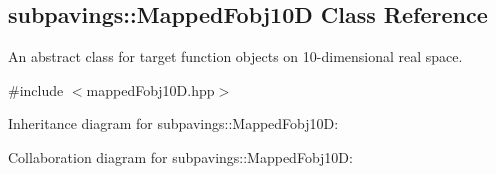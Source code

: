 \hypertarget{classsubpavings_1_1MappedFobj10D}{\subsection{subpavings\-:\-:\-Mapped\-Fobj10\-D \-Class \-Reference}
\label{classsubpavings_1_1MappedFobj10D}
}


\-An abstract class for target function objects on 10-\/dimensional real space.  




{\ttfamily \#include $<$mapped\-Fobj10\-D.\-hpp$>$}



\-Inheritance diagram for subpavings\-:\-:\-Mapped\-Fobj10\-D\-:


\-Collaboration diagram for subpavings\-:\-:\-Mapped\-Fobj10\-D\-:
